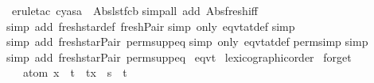 \begin{isabellebody}
\isamarkupfalse%
\ {\isacharparenleft}erule{\isacharunderscore}tac\ c{\isacharequal}{\isachardoublequoteopen}{\isacharparenleft}ya{\isacharcomma}sa{\isacharparenright}{\isachardoublequoteclose}\ \ Abs{\isacharunderscore}lst{}{\isacharunderscore}fcb{}{\isacharparenright}\isanewline
{}\isamarkupfalse%
{\isacharparenleft}simp{\isacharunderscore}all\ add{\isacharcolon}\ Abs{\isacharunderscore}fresh{\isacharunderscore}iff{\isacharparenright}\isanewline
{}\isamarkupfalse%
{\isacharparenleft}simp\ add{\isacharcolon}\ fresh{\isacharunderscore}star{\isacharunderscore}def\ fresh{\isacharunderscore}Pair{\isacharparenright}\isanewline
{}\isamarkupfalse%
{\isacharparenleft}simp\ only{\isacharcolon}\ eqvt{\isacharunderscore}at{\isacharunderscore}def{\isacharparenright}\isanewline
{}\isamarkupfalse%
{\isacharparenleft}simp{\isacharparenright}\isanewline
{}\isamarkupfalse%
{\isacharparenleft}simp\ add{\isacharcolon}\ fresh{\isacharunderscore}star{\isacharunderscore}Pair\ perm{\isacharunderscore}supp{\isacharunderscore}eq{\isacharparenright}\isanewline
{}\isamarkupfalse%
{\isacharparenleft}simp\ only{\isacharcolon}\ eqvt{\isacharunderscore}at{\isacharunderscore}def{\isacharparenright}\isanewline
{}\isamarkupfalse%
{\isacharparenleft}perm{\isacharunderscore}simp{\isacharparenright}\isanewline
{}\isamarkupfalse%
{\isacharparenleft}simp{\isacharparenright}\isanewline
{}\isamarkupfalse%
{\isacharparenleft}simp\ add{\isacharcolon}\ fresh{\isacharunderscore}star{\isacharunderscore}Pair\ perm{\isacharunderscore}supp{\isacharunderscore}eq{\isacharparenright}\isanewline
{}\isamarkupfalse%
%
\endisatagproof
{\isafoldproof}%
%
\isadelimproof
\isanewline
%
\endisadelimproof
{}\isamarkupfalse%
\ {\isacharparenleft}eqvt{\isacharparenright}\isanewline
%
\isadelimproof
%
\endisadelimproof
%
\isatagproof
{}\isamarkupfalse%
\ lexicographic{\isacharunderscore}order%
\endisatagproof
{\isafoldproof}%
%
\isadelimproof
\isanewline
%
\endisadelimproof
\isanewline
{}\isamarkupfalse%
\ forget{\isacharcolon}\isanewline
\ \ \ {\isachardoublequoteopen}atom\ x\ {\isasymsharp}\ t\ {\isasymLongrightarrow}\ t{\isacharbrackleft}x\ {\isacharcolon}{\isacharcolon}{\isacharequal}\ s{\isacharbrackright}\ {\isacharequal}\ t{\isachardoublequoteclose}\isanewline
%
\isadelimproof
%
\endisadelimproof
%
\isatagproof

\end{isabellebody}
